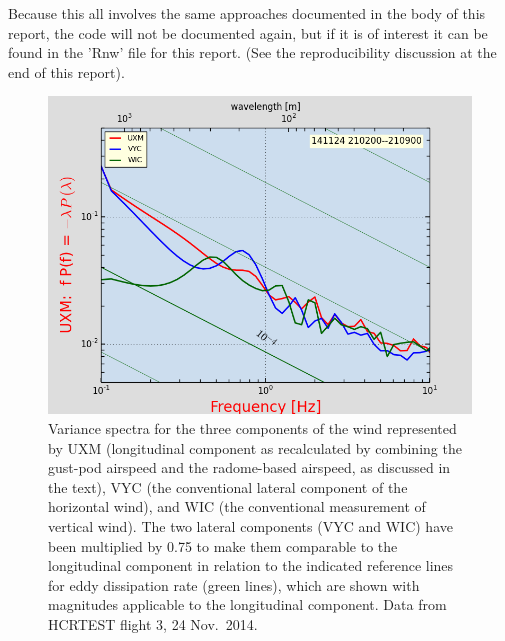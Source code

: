 \documentclass[12pt,twoside,english]{article}\usepackage[]{graphicx}\usepackage[]{color}
\let\OrgIndex\index
\renewcommand*{\index}[1]{\OrgIndex{#1}}
\begin{document}
Because this all involves the same approaches documented in the body of this report, the code will not be documented again, but if it is of interest it can be found in the 'Rnw' file for this report. (See the reproducibility discussion at the end of this report). 












\begin{figure}
\noindent \begin{centering}
\includegraphics[height=0.4\textheight]{SpecialGraphics/MEMPlot3Comp.png}  
\par\end{centering}

\protect\caption[Variance spectra for the three components of the wind.]{\label{fig:AppxB-3Comp}Variance spectra for the three components of the wind represented by UXM (longitudinal component as recalculated by combining the gust-pod airspeed and the radome-based airspeed, as discussed in the text), VYC (the conventional lateral component of the horizontal wind), and WIC (the conventional measurement of vertical wind). The two lateral components (VYC and WIC) have been multiplied by 0.75 to make them comparable to the longitudinal component in relation to the indicated reference lines for eddy dissipation rate (green lines), which are shown with magnitudes applicable to the longitudinal component. Data from HCRTEST flight 3, 24 Nov.\ 2014.} 
\end{figure}
\end{document}
